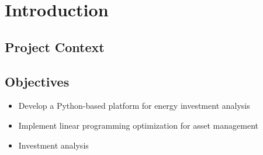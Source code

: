\newpage
\section{Introduction}



\subsection{Project Context}

\subsection{Objectives}
\begin{itemize}
    \item Develop a Python-based platform for energy investment analysis
    \item Implement linear programming optimization for asset management
    \item Investment analysis 
\end{itemize}
\newpage 
